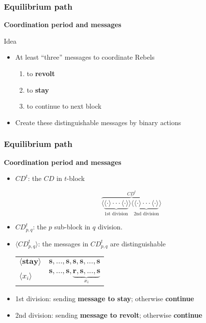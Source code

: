 \documentclass[10pt]{beamer}
\begin{document}
\begin{frame}
\frametitle{Equilibrium path}

\textbf{Coordination period and messages}

Idea
\begin{itemize}
\item At least ``\alert{three}'' messages to coordinate Rebels
\begin{enumerate}
\item to \textbf{revolt}
\item to \textbf{stay}
\item to continue to next block 
\end{enumerate}
\item Create these \alert{distinguishable} messages by binary actions
\end{itemize}



\end{frame}


\begin{frame}
\frametitle{Equilibrium path}

\textbf{Coordination period and messages}

\begin{itemize}
\item $CD^t$: the $CD$ in $t$-block

\[\overbrace{\langle\underbrace{\langle \cdot \rangle \cdot \cdot \cdot \langle \cdot \rangle}_{\text{1st division}}\rangle \langle\underbrace{\langle \cdot \rangle \cdot \cdot \cdot \langle \cdot \rangle}_{\text{2nd division}} \rangle }^{CD^t}\] 
\item $CD^t_{p,q}$: the $p$ sub-block in $q$ division.
\item $\langle CD^t_{p,q} \rangle$: the messages in $CD^t_{p,q}$ are \alert{distinguishable}
\begin{table}[h]
\begin{tabular}{l l}
$\langle \textbf{stay} \rangle$ & $\textbf{s},...,\textbf{s},\textbf{s},\textbf{s},...,\textbf{s}$  \\
$\langle x_i\rangle$ & $\textbf{s},...,\textbf{s},\underbrace{\textbf{r},\textbf{s},...,\textbf{s}}_{x_i}$ \\
\end{tabular}
\end{table}
\item 1st division: sending \textbf{message to stay}; otherwise \textbf{continue}
\item 2nd division: sending \textbf{message to revolt}; otherwise \textbf{continue}
\end{itemize}



\end{frame}
\end{document}
